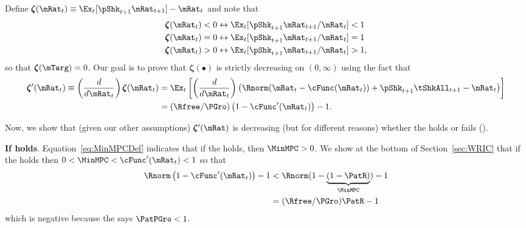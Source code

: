 \documentclass[\econtexRoot/BufferStockTheory]{subfiles}
\begin{document}
Define \providecommand{\difFunc}{\pmb{\zeta}} $\difFunc(\mRat_t) \equiv 
\Ex_t[\pShk_{t+1}\mRat_{t+1}] - \mRat_t$ and note that
\begin{equation}\begin{gathered}\begin{aligned}\label{eq:difRatioEquiv}
  \difFunc(\mRat_t) < 0 &\leftrightarrow \Ex_t[\pShk_{t+1}\mRat_{t+1}/\mRat_{t}] < 1 
                          \nonumber\\
  \difFunc(\mRat_t) = 0 &\leftrightarrow \Ex_t[\pShk_{t+1}\mRat_{t+1}/\mRat_{t}] = 1\\
  \difFunc(\mRat_t) > 0 &\leftrightarrow \Ex_t[\pShk_{t+1}\mRat_{t+1}/\mRat_{t}] > 
                          1,\nonumber
\end{aligned}\end{gathered}\end{equation}
so that $\difFunc(\mTarg)=0$. Our goal is to prove that $\difFunc(\bullet)$ is strictly 
decreasing on $(0,\infty)$ using the fact that
\begin{equation}\begin{gathered}\begin{aligned}
  \difFunc^{\prime}(\mRat_{t}) \equiv  \left( \frac{d}{d\mRat_{t}}\right) \difFunc(\mRat_t)  & = \Ex_{t}\left[
                                                                                               \left( \frac{d}{d\mRat_{t}}\right) \left( 
                                                                                               {\Rnorm}(\mRat_{t}-\cFunc(\mRat_{t}))+%
                                                                                               {\pShk}_{t+1}{\tShkAll}_{t+1} - {\mRat}_t\right) \right] \label{eq:difFuncDecreases} \\
                                                                                             & = (\Rfree/\PGro)\left(1-\cFunc^{\prime}({\mRat}_t)\right) - 1.  \notag
\end{aligned}\end{gathered}\end{equation}

Now, we show that (given our other assumptions) $\difFunc^{\prime}(\mRat)$ is decreasing (but for different reasons) whether the {\RIC} holds or fails (\cncl{\RIC}).

\textbf{If {\RIC} holds}. Equation~\eqref{eq:MinMPCDef} indicates that if the {\RIC} holds, then $\MinMPC >0$.  We show at the bottom of Section~\ref{sec:WRIC} that if the {\RIC} holds then $0 < \MinMPC < \cFunc^{\prime}(\mRat_{t}) < 1$ so that 
\begin{align*}
  \Rnorm\left(1-\cFunc^{\prime}({\mRat}_t)\right) - 1 & <  \Rnorm(1-\underbrace{(1-\PatR)}_{\MinMPC}) - 1  \\
                                                      & = (\Rfree/\PGro)\PatR - 1 
\end{align*}
which is negative because the {\GICAbs} says $\PatPGro < 1$.  
\end{document}
